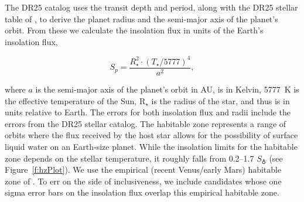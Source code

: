 The DR25 catalog uses the transit depth and period, along with the DR25 stellar table of \citet{Mathur2017ApJS}, to derive the planet radius and the semi-major axis of the planet's orbit.  From these we calculate the insolation flux in units of the Earth's insolation flux,

\begin{equation}
S_{p} = \frac{R_{\star}^{2} \cdot (T_{\star}/5777)^{4}}{a^{2}} ,
\end{equation}

\noindent where $a$ is the semi-major axis of the planet's orbit in AU, \tstar{} is in Kelvin, 5777~K is the effective temperature of the Sun, R$_{\star}$ is the radius of the star, and thus \sp{} is in units relative to Earth. The errors for both insolation flux and radii include the errors from the DR25 stellar catalog. The habitable zone represents a range of orbits where the flux received by the host star allows for the possibility of surface liquid water on an Earth-size planet.  While the insolation limits for the habitable zone depends on the stellar temperature, it roughly falls from 0.2--1.7 $S_{\earth}$ (see Figure~\ref{f:hzPlot}). We use the empirical (recent Venus/early Mars) habitable zone of \citet{Kopparapu2013}.  To err on the side of inclusiveness, we include candidates whose one sigma error bars on the insolation flux overlap this empirical habitable zone.





